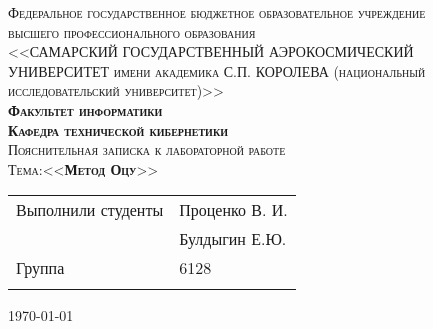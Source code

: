\begin{titlepage}
\thispagestyle{empty}
\begin{center}\textsc{
Федеральное государственное бюджетное образовательное учреждение\\
высшего профессионального образования\\
<<САМАРСКИЙ ГОСУДАРСТВЕННЫЙ АЭРОКОСМИЧЕСКИЙ\\
УНИВЕРСИТЕТ имени академика С.П. КОРОЛЕВА
(национальный исследовательский университет)>>\\[50pt]
\textbf{Факультет информатики} \\[20pt]
\textbf{Кафедра технической кибернетики}}\\[30pt]
\textsc{
Пояснительная записка к лабораторной работе\\[30pt]
\large{Тема:<<\textbf{Метод Оцу}>>}\\[110pt]
}
\end{center}
\vfill
{\large
\begin{tabular*}{\textwidth}{@{\extracolsep{\fill}}ll}
	Выполнили студенты& Проценко В. И.\\
						    & Булдыгин Е.Ю.\\[10pt]
	Группа & 6128 \\[10pt]\\
\end{tabular*}
}
\vfill
\begin{center}
\large \today
\end{center}
\clearpage
\end{titlepage}